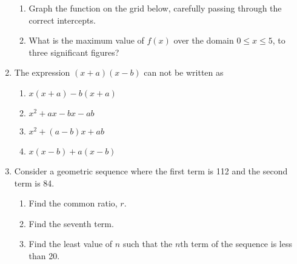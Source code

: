 \documentclass[12pt, oneside]{article}
\begin{document}
\begin{enumerate}
\begin{enumerate}
      \item Graph the function on the grid below, carefully passing through the correct intercepts.
          \begin{flushright}[3]\end{flushright}
      \item What is the maximum value of $f(x)$ over the domain $0 \leq x \leq 5$, to three significant figures?
          \begin{flushright}[2]\end{flushright}
  \end{enumerate}
    \begin{center}
    \end{center}

\newpage

\item The expression $(x + a)(x - b)$ can not be written as
\begin{enumerate}
    \item $x(x + a)- b(x + a)$
    \item $x^2 + ax - bx - ab$
    \item  $x^2 + (a - b)x + ab$
    \item $x(x - b)+ a(x - b)$
\end{enumerate}
        \begin{flushright}[2]\end{flushright}

\item Consider a geometric sequence where the first term is 112 and the second term is 84.
\begin{enumerate}
    \item Find the common ratio, $r$.\\[20pt]
        \begin{flushright}[1]\end{flushright}
    \item Find the seventh term.\\[80pt]
        \begin{flushright}[2]\end{flushright}
    \item Find the least value of $n$ such that the $n$th term of the sequence is less than 20. \\[80pt]
        \begin{flushright}[3]\end{flushright}
\end{enumerate}


\end{enumerate}
\end{document}
